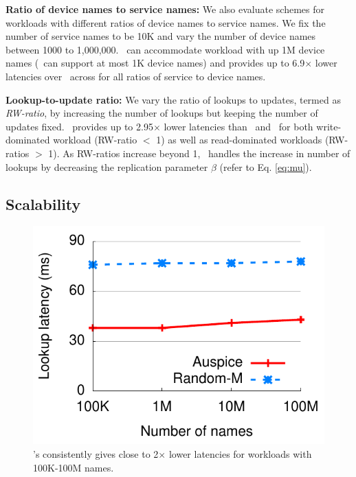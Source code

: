 {\textbf{Ratio of device names to service names:} We also evaluate schemes for workloads with different ratios of device names to service names.
We fix the number of service names to be 10K and vary the number of device names between 1000 to 1,000,000.
\auspice\  can accommodate workload with up 1M device names (\replicateall\ can support at most 1K device names) and provides up to 6.9$\times$ lower latencies over \staticthree\  across for all ratios of service to device names.


\textbf{Lookup-to-update ratio:} We vary the ratio of lookups to updates, termed as \emph{RW-ratio}, by increasing the number of lookups but keeping the number of updates fixed. \auspice\ provides up to 2.95$\times$ lower latencies than \codons\ and \staticthree\ for both write-dominated workload (RW-ratio $<$ 1) as well as read-dominated workloads (RW-ratios  $>$ 1). As RW-ratios increase beyond 1,  \auspice\ handles the increase in number of lookups  by decreasing the replication parameter $\beta$ (refer to Eq. \ref{eq:mu}).
}
\subsection{Scalability}
\label{sec:scalability}

\begin{figure}[t]
\centering
\includegraphics[scale=0.6]{auspice/graph/newgraphs/scalability.pdf}
\caption{\auspice's consistently gives close to 2$\times$ lower latencies for workloads with 100K-100M names.}
\vspace{-0.2in}
\label{fig:scalability}
\end{figure}

